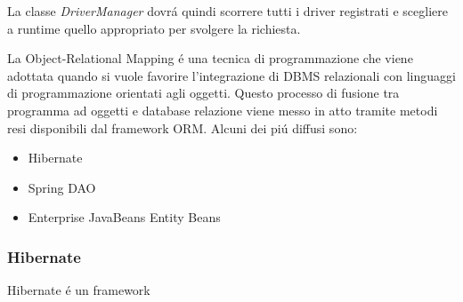 \documentclass[12pt,a4paper,onecolumn,x11names]{article}
\begin{document}
				\begin{flushleft}
					La classe \textit{DriverManager} dovr\'{a} quindi scorrere tutti i driver registrati e scegliere a runtime quello appropriato per svolgere la richiesta.\newline
					
						La Object-Relational Mapping \'{e} una tecnica di programmazione che viene adottata quando si vuole favorire l'integrazione di DBMS relazionali con linguaggi di programmazione orientati agli oggetti. Questo processo di fusione tra programma ad oggetti e database relazione viene messo in atto tramite metodi resi disponibili dal framework ORM. Alcuni dei pi\'{u} diffusi sono:
						
						\begin{itemize}
							\item Hibernate
							\item Spring DAO
							\item Enterprise JavaBeans Entity Beans
						\end{itemize}		
				\end{flushleft}
		
		
			\subsubsection{Hibernate}
				\begin{flushleft}
					Hibernate \'{e} un framework
				\end{flushleft}
	\newpage
\end{document}
